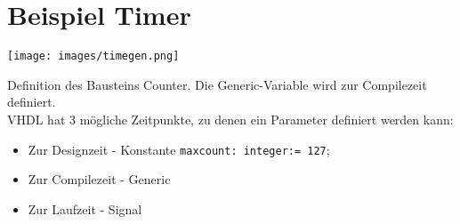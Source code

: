 \section{Beispiel Timer}
\begin{minipage}[]{0.485\textwidth}
\texttt{[image: images/timegen.png]}

Definition des Bausteins Counter. Die Generic-Variable wird zur Compilezeit definiert.\\
VHDL hat 3 mögliche Zeitpunkte, zu denen ein Parameter definiert werden kann:
\begin{itemize}
\itemsep0em
\item Zur Designzeit - Konstante \texttt{maxcount: integer:= 127};
\item Zur Compilezeit - Generic
\item Zur Laufzeit - Signal
\end{itemize} 


\end{minipage}
\hspace{0.01\textwidth}
\begin{minipage}[]{0.485\textwidth}

\end{minipage}
